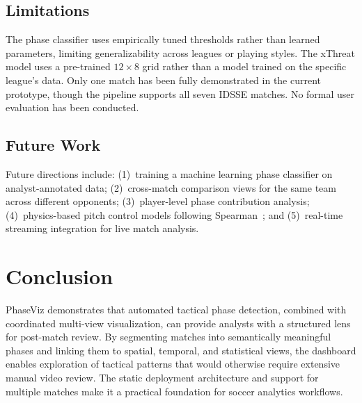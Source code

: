 \documentclass{vgtc}                          %
\begin{document}
\subsection{Limitations}

The phase classifier uses empirically tuned thresholds rather than learned parameters, limiting generalizability across leagues or playing styles. The xThreat model uses a pre-trained $12{\times}8$ grid rather than a model trained on the specific league's data. Only one match has been fully demonstrated in the current prototype, though the pipeline supports all seven IDSSE matches. No formal user evaluation has been conducted.

\subsection{Future Work}

Future directions include: (1)~training a machine learning phase classifier on analyst-annotated data; (2)~cross-match comparison views for the same team across different opponents; (3)~player-level phase contribution analysis; (4)~physics-based pitch control models following Spearman~\cite{spearman2018}; and (5)~real-time streaming integration for live match analysis.

\section{Conclusion}

PhaseViz demonstrates that automated tactical phase detection, combined with coordinated multi-view visualization, can provide analysts with a structured lens for post-match review. By segmenting matches into semantically meaningful phases and linking them to spatial, temporal, and statistical views, the dashboard enables exploration of tactical patterns that would otherwise require extensive manual video review. The static deployment architecture and support for multiple matches make it a practical foundation for soccer analytics workflows.



\end{document}
